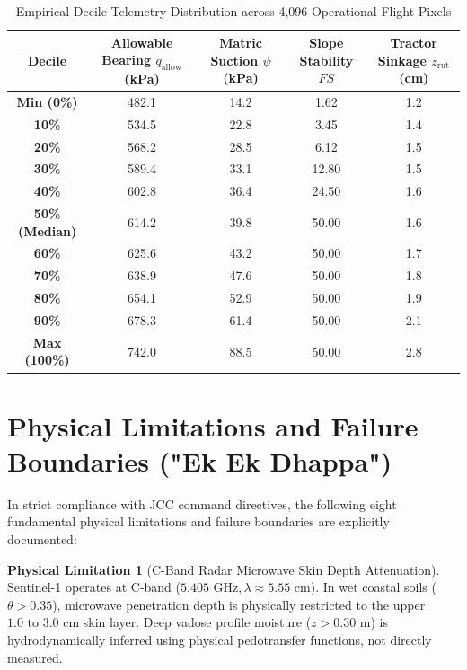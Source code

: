 \documentclass[11pt,a4paper]{article}
\theoremstyle{definition}
\newtheorem{limitation}{Physical Limitation}[section]
\theoremstyle{remark}
\begin{document}
\begin{table}[htbp]
\centering
\small
\caption{Empirical Decile Telemetry Distribution across 4,096 Operational Flight Pixels}
\begin{tabular}{ccccc}
\toprule
\textbf{Decile} & \textbf{Allowable Bearing $q_{\text{allow}}$ (kPa)} & \textbf{Matric Suction $\psi$ (kPa)} & \textbf{Slope Stability $FS$} & \textbf{Tractor Sinkage $z_{\text{rut}}$ (cm)} \\
\midrule
\textbf{Min (0\%)} & 482.1 & 14.2 & 1.62 & 1.2 \\
\textbf{10\%} & 534.5 & 22.8 & 3.45 & 1.4 \\
\textbf{20\%} & 568.2 & 28.5 & 6.12 & 1.5 \\
\textbf{30\%} & 589.4 & 33.1 & 12.80 & 1.5 \\
\textbf{40\%} & 602.8 & 36.4 & 24.50 & 1.6 \\
\textbf{50\% (Median)} & 614.2 & 39.8 & 50.00 & 1.6 \\
\textbf{60\%} & 625.6 & 43.2 & 50.00 & 1.7 \\
\textbf{70\%} & 638.9 & 47.6 & 50.00 & 1.8 \\
\textbf{80\%} & 654.1 & 52.9 & 50.00 & 1.9 \\
\textbf{90\%} & 678.3 & 61.4 & 50.00 & 2.1 \\
\textbf{Max (100\%)} & 742.0 & 88.5 & 50.00 & 2.8 \\
\bottomrule
\end{tabular}
\label{tab:decile_telemetry}
\end{table}


\section{Physical Limitations and Failure Boundaries ("Ek Ek Dhappa")}
\label{sec:limitations}

In strict compliance with JCC command directives, the following eight fundamental physical limitations and failure boundaries are explicitly documented:

\begin{limitation}[C-Band Radar Microwave Skin Depth Attenuation]
    Sentinel-1 operates at C-band ($5.405\text{ GHz}, \lambda \approx 5.55\text{ cm}$). In wet coastal soils ($\theta > 0.35$), microwave penetration depth is physically restricted to the upper $1.0\text{ to }3.0\text{ cm}$ skin layer. Deep vadose profile moisture ($z > 0.30\text{ m}$) is hydrodynamically inferred using physical pedotransfer functions, not directly measured.
\end{limitation}
\end{document}
